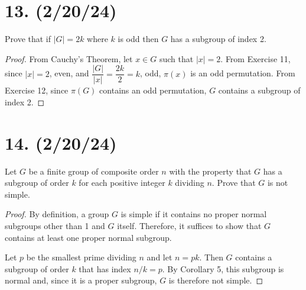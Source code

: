 \documentclass{article}
\begin{document}
\section*{13. (2/20/24)}

Prove that if $|G| = 2k$ where $k$ is odd then $G$ has a subgroup of index 2.

\begin{proof}
    From Cauchy's Theorem, let $x \in G$ such that $|x| = 2$. From Exercise 11, since $|x| = 2$, even, and $\dfrac{|G|}{|x|} = \dfrac{2k}{2} = k$, odd, $\pi(x)$ is an odd permutation. From Exercise 12, since $\pi(G)$ contains an odd permutation, $G$ contains a subgroup of index 2.
\end{proof}

\section*{14. (2/20/24)}

Let $G$ be a finite group of composite order $n$ with the property that $G$ has a subgroup of order $k$ for each positive integer $k$ dividing $n$. Prove that $G$ is not simple.

\begin{proof}
    By definition, a group $G$ is simple if it contains no proper normal subgroups other than 1 and $G$ itself. Therefore, it suffices to show that $G$ contains at least one proper normal subgroup.

    Let $p$ be the smallest prime dividing $n$ and let $n = pk$. Then $G$ contains a subgroup of order $k$ that has index $n/k = p$. By Corollary 5, this subgroup is normal and, since it is a proper subgroup, $G$ is therefore not simple.
\end{proof}
\end{document}
